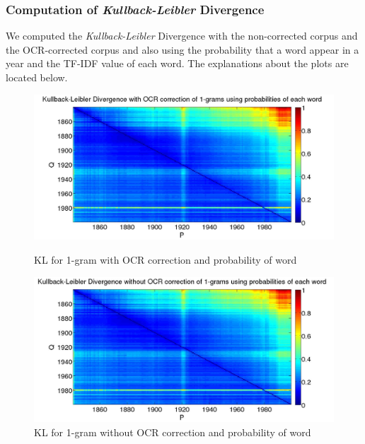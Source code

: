 \subsubsection{Computation of \emph{Kullback-Leibler} Divergence}
We computed the \emph{Kullback-Leibler} Divergence with the non-corrected corpus and the OCR-corrected corpus and also using the probability that a word appear in a year and the TF-IDF value of each word. The explanations about the plots are located below.

\begin{figure}[H]
    \begin{minipage}[b]{0.48\linewidth}
        \includegraphics[scale=0.15]{Pictures/kullback-leibler/KL_1-grams_with_correction_proba.jpg}
        \caption{KL for 1-gram with OCR correction and probability of word}
        \label{KL-PC1}
    \end{minipage}\hfill
    \begin{minipage}[b]{0.5\linewidth}
        \includegraphics[scale=0.15]{Pictures/kullback-leibler/KL_1-grams_without_correction_proba.jpg}
        \caption{KL for 1-gram without OCR correction and probability of word}
        \label{KL-PN1}
    \end{minipage}\hfill
\end{figure}

